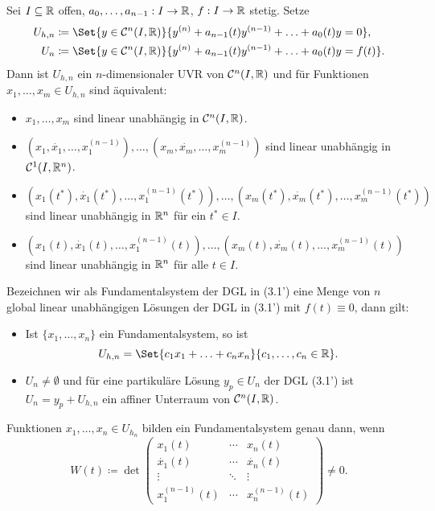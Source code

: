 \documentclass{cheat-sheet}
\begin{document}
\begin{satz}
  Sei $I \subseteq \mathbb{R}$ offen, $a_0, \ldots, a_{n-1} : I \to \mathbb{R}$, $f : I \to \mathbb{R}$ stetig. Setze
  \begin{align*}
    U_{h,n} &\coloneqq \Set{ y \in \mathcal{C}^n(I, \R) }{ y^{(n)} + a_{n-1}(t) y^{(n-1)} + \ldots + a_0(t) y = 0 },\\
    U_{n} &\coloneqq \Set{ y \in \mathcal{C}^n(I, \R) }{ y^{(n)} + a_{n-1}(t) y^{(n-1)} + \ldots + a_0(t) y = f(t) }.
  \end{align*}
  Dann ist $U_{h,n}$ ein $n$-dimensionaler UVR von $\mathcal{C}^n(I, \mathbb{R})$ und für Funktionen $x_1, \ldots, x_m \in U_{h,n}$ sind äquivalent:
  \begin{itemize}
    \item $x_1, \ldots, x_m$ sind linear unabhängig in $\mathcal{C}^n(I, \mathbb{R})$.
    \item $(x_1, \dot{x_1}, \ldots, x_1^{(n-1)}), \ldots, (x_m, \dot{x_m}, \ldots, x_m^{(n-1)})$ sind linear unabhängig in $\mathcal{C}^1(I, \mathbb{R}^n)$.
    \item $(x_1(t^*), \dot{x_1}(t^*), \ldots, x_1^{(n-1)}(t^*)), \ldots, (x_m(t^*), \dot{x_m}(t^*), \ldots, x_m^{(n-1)}(t^*))$ sind linear unabhängig in $\mathbb{R}^n$ für ein $t^* \in I$.
    \item $(x_1(t), \dot{x_1}(t), \ldots, x_1^{(n-1)}(t)), \ldots, (x_m(t), \dot{x_m}(t), \ldots, x_m^{(n-1)}(t))$ sind linear unabhängig in $\mathbb{R}^n$ für alle $t \in I$.
  \end{itemize}
  Bezeichnen wir als Fundamentalsystem der DGL in (3.1') eine Menge von $n$ global linear unabhängigen Lösungen der DGL in (3.1') mit $f(t) \equiv 0$, dann gilt:
  \begin{itemize}
    \item Ist $\{ x_1, \ldots, x_n \}$ ein Fundamentalsystem, so ist
    \[ U_{h,n} = \Set{c_1 x_1 + \ldots + c_n x_n}{c_1, \ldots, c_n \in \R}. \]
    \item $U_n \not= \emptyset$ und für eine partikuläre Lösung $y_p \in U_n$ der DGL (3.1') ist $U_n = y_p + U_{h,n}$ ein affiner Unterraum von $\mathcal{C}^n(I, \mathbb{R})$.
  \end{itemize}
\end{satz}

\begin{bem}
  Funktionen $x_1, \ldots, x_n \in U_{h_n}$ bilden ein Fundamentalsystem genau dann, wenn
  \[
    W(t) \coloneqq \det \begin{pmatrix}
      x_1(t) & \cdots & x_n(t) \\
      \dot{x_1}(t) & \cdots & \dot{x_n}(t) \\
      \vdots & \ddots & \vdots \\
      x_1^{(n-1)}(t) & \cdots & x_n^{(n-1)}(t)
    \end{pmatrix} \not= 0.
  \]
\end{bem}
\end{document}
